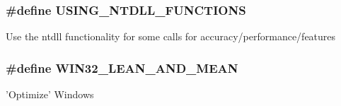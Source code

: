 \subsubsection[{U\-S\-I\-N\-G\-\_\-\-N\-T\-D\-L\-L\-\_\-\-F\-U\-N\-C\-T\-I\-O\-N\-S}]{\setlength{\rightskip}{0pt plus 5cm}\#define U\-S\-I\-N\-G\-\_\-\-N\-T\-D\-L\-L\-\_\-\-F\-U\-N\-C\-T\-I\-O\-N\-S}\label{build_8h_aa629308f4e18ecde3423ec692fe0eadc}
Use the ntdll functionality for some calls for accuracy/performance/features 
\subsubsection[{W\-I\-N32\-\_\-\-L\-E\-A\-N\-\_\-\-A\-N\-D\-\_\-\-M\-E\-A\-N}]{\setlength{\rightskip}{0pt plus 5cm}\#define W\-I\-N32\-\_\-\-L\-E\-A\-N\-\_\-\-A\-N\-D\-\_\-\-M\-E\-A\-N}\label{build_8h_ac7bef5d85e3dcd73eef56ad39ffc84a9}
'Optimize' Windows 